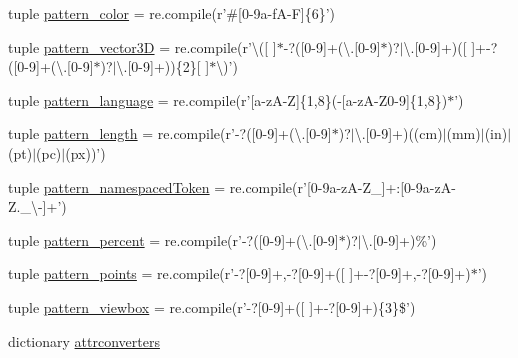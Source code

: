 \begin{DoxyCompactItemize}
\item 
tuple \hyperlink{namespaceodf_1_1attrconverters_a942ee7e8270b6cb9f232b85d91f167cc}{pattern\+\_\+color} = re.\+compile(r'\#\mbox{[}0-\/9a-\/f\+A-\/\+F\mbox{]}\{6\}')
\item 
tuple \hyperlink{namespaceodf_1_1attrconverters_adcdf5feb55fad2176b65fc447fae6957}{pattern\+\_\+vector3\+D} = re.\+compile(r'\textbackslash{}(\mbox{[} \mbox{]}$\ast$-\/?(\mbox{[}0-\/9\mbox{]}+(\textbackslash{}.\mbox{[}0-\/9\mbox{]}$\ast$)?$\vert$\textbackslash{}.\mbox{[}0-\/9\mbox{]}+)(\mbox{[} \mbox{]}+-\/?(\mbox{[}0-\/9\mbox{]}+(\textbackslash{}.\mbox{[}0-\/9\mbox{]}$\ast$)?$\vert$\textbackslash{}.\mbox{[}0-\/9\mbox{]}+))\{2\}\mbox{[} \mbox{]}$\ast$\textbackslash{})')
\item 
tuple \hyperlink{namespaceodf_1_1attrconverters_ad9906afdc77dcf5ec8024ddea8af2cd3}{pattern\+\_\+language} = re.\+compile(r'\mbox{[}a-\/z\+A-\/Z\mbox{]}\{1,8\}(-\/\mbox{[}a-\/z\+A-\/Z0-\/9\mbox{]}\{1,8\})$\ast$')
\item 
tuple \hyperlink{namespaceodf_1_1attrconverters_aa90a2e19771f728a7a760efaeb548853}{pattern\+\_\+length} = re.\+compile(r'-\/?(\mbox{[}0-\/9\mbox{]}+(\textbackslash{}.\mbox{[}0-\/9\mbox{]}$\ast$)?$\vert$\textbackslash{}.\mbox{[}0-\/9\mbox{]}+)((cm)$\vert$(mm)$\vert$(in)$\vert$(pt)$\vert$(pc)$\vert$(px))')
\item 
tuple \hyperlink{namespaceodf_1_1attrconverters_a8b1acec5f51ab504076429de4a44e126}{pattern\+\_\+namespaced\+Token} = re.\+compile(r'\mbox{[}0-\/9a-\/z\+A-\/\+Z\+\_\+\mbox{]}+\+:\mbox{[}0-\/9a-\/z\+A-\/\+Z.\+\_\+\textbackslash{}-\/\mbox{]}+')
\item 
tuple \hyperlink{namespaceodf_1_1attrconverters_a579361611ccfad779029c701add3beac}{pattern\+\_\+percent} = re.\+compile(r'-\/?(\mbox{[}0-\/9\mbox{]}+(\textbackslash{}.\mbox{[}0-\/9\mbox{]}$\ast$)?$\vert$\textbackslash{}.\mbox{[}0-\/9\mbox{]}+)\%')
\item 
tuple \hyperlink{namespaceodf_1_1attrconverters_aba1cc76213c8ca3e229a93e09ac6f4ee}{pattern\+\_\+points} = re.\+compile(r'-\/?\mbox{[}0-\/9\mbox{]}+,-\/?\mbox{[}0-\/9\mbox{]}+(\mbox{[} \mbox{]}+-\/?\mbox{[}0-\/9\mbox{]}+,-\/?\mbox{[}0-\/9\mbox{]}+)$\ast$')
\item 
tuple \hyperlink{namespaceodf_1_1attrconverters_a3df24b76956ae1cb73bf3fd649d558a3}{pattern\+\_\+viewbox} = re.\+compile(r'-\/?\mbox{[}0-\/9\mbox{]}+(\mbox{[} \mbox{]}+-\/?\mbox{[}0-\/9\mbox{]}+)\{3\}\$')
\item 
dictionary \hyperlink{namespaceodf_1_1attrconverters_aa546908cd138bdd3bd7fd61e75ebc87f}{attrconverters}
\end{DoxyCompactItemize}


